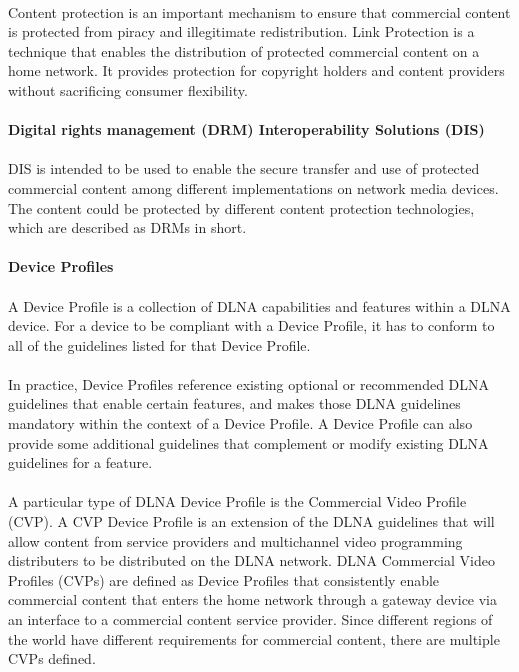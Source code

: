 \\
Content protection is an important mechanism to ensure that commercial content is protected 
from piracy and illegitimate redistribution. Link Protection is a technique that enables the
distribution of protected commercial content on a home network. It provides
protection for copyright holders and content providers without sacrificing
consumer flexibility.\\
\\
\textbf{Digital rights management (DRM) Interoperability Solutions (DIS) }\\ 
\\
DIS is intended to be used to enable the secure transfer and use of protected 
commercial content among different implementations on network media devices. 
The content could be protected by different content protection technologies, 
which are described as DRMs in short. \\
\\
\textbf{Device Profiles}\\ 
\\
A Device Profile is a collection of DLNA capabilities and features within a DLNA device. For a device 
to be compliant with a Device Profile, it has to conform to all of the guidelines listed for that 
Device Profile. \\
\\
In practice, Device Profiles reference existing optional or recommended DLNA guidelines that enable certain features, and makes those DLNA guidelines mandatory within the context of a Device Profile. 
A Device Profile can also provide some additional guidelines that complement or
modify existing DLNA guidelines for a feature.\\
\\
A particular type of DLNA Device Profile is the Commercial Video Profile (CVP).
A CVP Device Profile is an extension of the DLNA guidelines that will allow
content from service providers and multichannel video programming distributers to be distributed on the DLNA network. DLNA Commercial Video Profiles (CVPs) are defined as Device Profiles that consistently enable commercial content that enters the home network through a gateway device via an interface to a commercial content service provider. Since different regions of the world have different requirements for commercial content, there are multiple CVPs defined.

